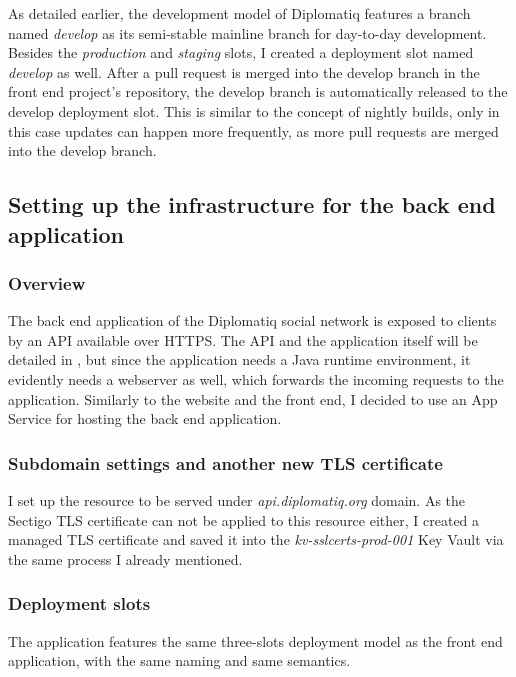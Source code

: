 As detailed earlier, the development model of Diplomatiq features a branch named \emph{develop} as its semi-stable mainline branch for day-to-day development. Besides the \emph{production} and \emph{staging} slots, I created a deployment slot named \emph{develop} as well. After a pull request is merged into the develop branch in the front end project's repository, the develop branch is automatically released to the develop deployment slot. This is similar to the concept of nightly builds, only in this case updates can happen more frequently, as more pull requests are merged into the develop branch.

\subsection{Setting up the infrastructure for the back end application}

\subsubsection{Overview}

The back end application of the Diplomatiq social network is exposed to clients by an API available over HTTPS. The API and the application itself will be detailed in , but since the application needs a Java runtime environment, it evidently needs a webserver as well, which forwards the incoming requests to the application. Similarly to the website and the front end, I decided to use an App Service for hosting the back end application.

\subsubsection{Subdomain settings and another new TLS certificate}

I set up the resource to be served under \emph{api.diplomatiq.org} domain. As the Sectigo TLS certificate can not be applied to this resource either, I created a managed TLS certificate and saved it into the \emph{kv-sslcerts-prod-001} Key Vault via the same process I already mentioned.

\subsubsection{Deployment slots}

The application features the same three-slots deployment model as the front end application, with the same naming and same semantics.

